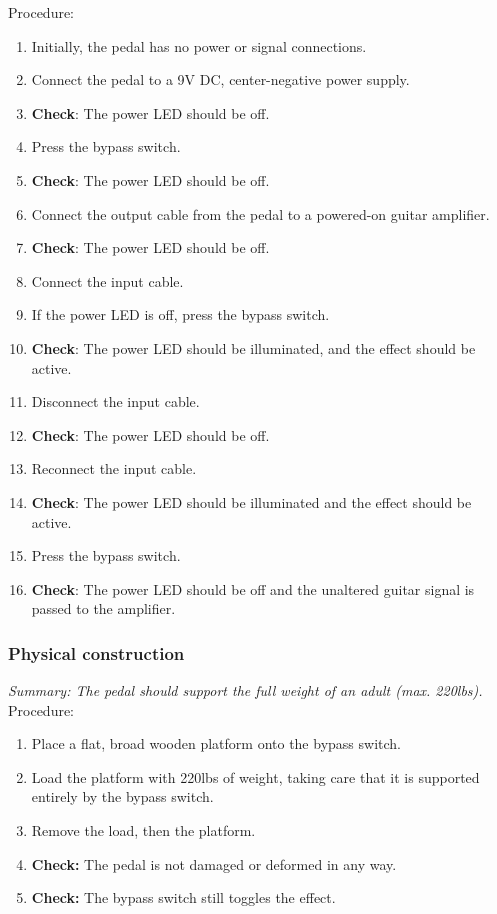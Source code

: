 \documentclass[12pt]{article}
\begin{document}
Procedure:
\begin{enumerate}
    \item Initially, the pedal has no power or signal connections.
    \item Connect the pedal to a 9V DC, center-negative power supply.
    \item \textbf{Check}: The power LED should be off.
    \item Press the bypass switch.
    \item \textbf{Check}: The power LED should be off.
    \item Connect the output cable from the pedal to a powered-on guitar amplifier.
    \item \textbf{Check}: The power LED should be off.
    \item Connect the input cable.
    \item If the power LED is off, press the bypass switch.
    \item \textbf{Check}: The power LED should be illuminated, and the effect should be active.
    \item Disconnect the input cable.
    \item \textbf{Check}: The power LED should be off.
    \item Reconnect the input cable.
    \item \textbf{Check}: The power LED should be illuminated and the effect should be active.
    \item Press the bypass switch.
    \item \textbf{Check}: The power LED should be off and the unaltered guitar signal is passed to the amplifier.
\end{enumerate}
\subsubsection{Physical construction}

\textit{Summary: The pedal should support the full weight of an adult (max. 220lbs).}\\

Procedure:
\begin{enumerate}
    \item Place a flat, broad wooden platform onto the bypass switch.
    \item Load the platform with 220lbs of weight, taking care that it is supported entirely by the bypass switch.
    \item Remove the load, then the platform.
    \item \textbf{Check:} The pedal is not damaged or deformed in any way.
    \item \textbf{Check:} The bypass switch still toggles the effect.
\end{enumerate}
\end{document}
